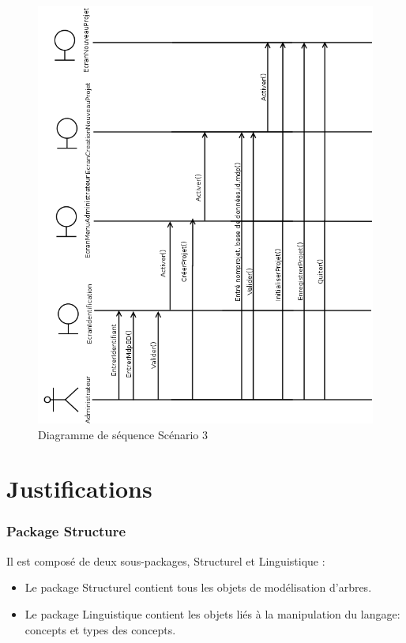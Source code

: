 \documentclass[12pt]{report}
\begin{document}
\begin{figure}[h!]
\begin{center}
\includegraphics[scale=0.34]{DiagSeq3.png}
\caption{Diagramme de séquence Scénario 3}
\end{center}
\end{figure}


\section{Justifications}

\subsubsection*{Package Structure}
Il est composé de deux sous-packages, Structurel et Linguistique :

\begin{itemize}
\item Le package Structurel contient tous les objets de modélisation d'arbres.
\item Le package Linguistique contient les objets liés à la manipulation du langage: concepts et types des concepts.
\end{itemize}
\end{document}

